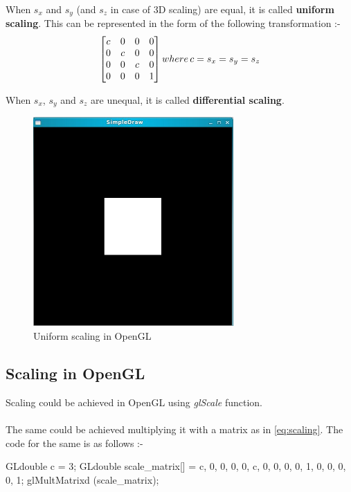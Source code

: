 \documentclass[a4paper,12pt,titlepage,twosided]{article}
\begin{document}
	When $s_x$ and $s_y$ (and $s_z$ in case of 3D scaling) are equal, it is called \textbf{uniform scaling}. This can be represented in the form of the following transformation :-
	\begin {equation}
		\begin{bmatrix}
			c & 0 & 0 & 0 \\
			0 & c & 0 & 0 \\
			0 & 0 & c & 0 \\
			0 & 0 & 0 & 1
		\end{bmatrix}
		\\ where\, c = s_x = s_y = s_z
		\label{eq:scaling}
	\end{equation}

	When $s_x$, $s_y$ and $s_z$ are unequal, it is called \textbf{differential scaling}.

	\begin{figure}
		\includegraphics[height=80mm]{Images_final/Square_scaled.jpg}
		\caption{Uniform scaling in OpenGL}
		\label{fig:uniform_scaling}
	\end{figure}

	\subsection{Scaling in OpenGL}
	Scaling could be achieved in OpenGL using \emph{glScale} function.\\ \\
	The same could be achieved multiplying it with a matrix as in \eqref{eq:scaling}. The code for the same is as follows :-
	\begin{code}
		GLdouble c   = 3;
		GLdouble scale_matrix[] = { c, 0, 0, 0, 
					    0, c, 0, 0,
					    0, 0, 1, 0, 
					    0, 0, 0, 1};
		glMultMatrixd (scale_matrix);
	\end{code}
\end{document}
